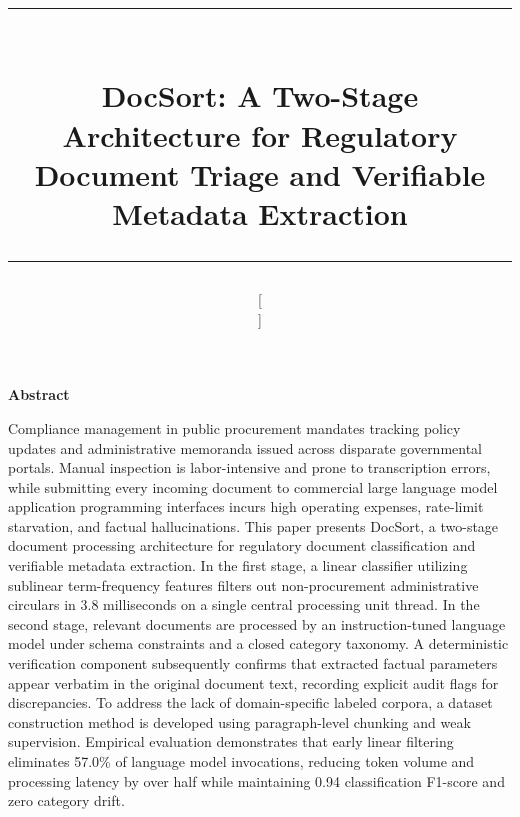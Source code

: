 \documentclass[conference]{IEEEtran}
\renewenvironment{abstract}{%
  \begin{center}%
    \bfseries\large Abstract\par\vspace{0.8ex}%
  \end{center}%
  \bfseries\small\noindent\ignorespaces%
}{%
  \par\vspace{1.5ex}%
}
\begin{document}
\title{
\noindent\rule{\linewidth}{2.5pt}\vspace{1.5ex}\\
DocSort: A Two-Stage Architecture for Regulatory Document Triage and Verifiable Metadata Extraction\vspace{1.2ex}\\
\noindent\rule{\linewidth}{0.8pt}\vspace{-1ex}
}

\author{
\and[\hfill\mbox{}\par\vspace{2.5ex}\mbox{}\hfill]
\and
{}
\and
{}
}

\maketitle

\begin{abstract}
Compliance management in public procurement mandates tracking policy updates and administrative memoranda issued across disparate governmental portals. Manual inspection is labor-intensive and prone to transcription errors, while submitting every incoming document to commercial large language model application programming interfaces incurs high operating expenses, rate-limit starvation, and factual hallucinations. This paper presents DocSort, a two-stage document processing architecture for regulatory document classification and verifiable metadata extraction. In the first stage, a linear classifier utilizing sublinear term-frequency features filters out non-procurement administrative circulars in 3.8 milliseconds on a single central processing unit thread. In the second stage, relevant documents are processed by an instruction-tuned language model under schema constraints and a closed category taxonomy. A deterministic verification component subsequently confirms that extracted factual parameters appear verbatim in the original document text, recording explicit audit flags for discrepancies. To address the lack of domain-specific labeled corpora, a dataset construction method is developed using paragraph-level chunking and weak supervision. Empirical evaluation demonstrates that early linear filtering eliminates 57.0\% of language model invocations, reducing token volume and processing latency by over half while maintaining 0.94 classification F1-score and zero category drift.
\end{abstract}
\end{document}
